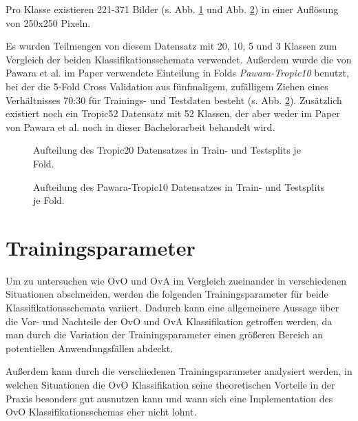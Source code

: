 Pro Klasse existieren 221-371 Bilder (s. Abb. \ref{fig:tropic20Zusammensetzung} und Abb. \ref{fig:pawaraTropic10Zusammensetzung}) in einer Auflösung von 250x250 Pixeln.

Es wurden Teilmengen von diesem Datensatz mit 20, 10, 5 und 3 Klassen zum Vergleich der beiden Klassifikationsschemata verwendet. Außerdem wurde die von Pawara et al. im Paper \cite{pawaraPaper} verwendete Einteilung in Folds \textit{Pawara-Tropic10} \cite{pawaraWebsiteDatensaetze} benutzt, bei der die 5-Fold Cross Validation aus fünfmaligem, zufälligem Ziehen eines Verhältnisses 70:30 für Trainings- und Testdaten besteht (s. Abb. \ref{fig:pawaraTropic10Zusammensetzung}).
Zusätzlich existiert noch ein Tropic52 Datensatz \cite{pawaraWebsiteDatensaetze} mit 52 Klassen, der aber weder im Paper von Pawara et al. \cite{pawaraPaper} noch in dieser Bachelorarbeit behandelt wird.

\begin{figure}[H]
\begin{adjustbox}{width=1.2\textwidth, center}

\end{adjustbox}
\caption{Aufteilung des Tropic20 Datensatzes \cite{pawaraWebsiteDatensaetze} in Train- und Testsplits je Fold.}
\label{fig:tropic20Zusammensetzung}
\end{figure}
\begin{figure}[H]
\begin{adjustbox}{width=1.2\textwidth, center}

\end{adjustbox}
\caption{Aufteilung des Pawara-Tropic10 Datensatzes \cite{pawaraWebsiteDatensaetze} in Train- und Testsplits je Fold.}
\label{fig:pawaraTropic10Zusammensetzung}
\end{figure}


\section{Trainingsparameter}
\label{ch:methodik_parameter}
Um zu untersuchen wie OvO und OvA im Vergleich zueinander in verschiedenen Situationen abschneiden, werden die folgenden Trainingsparameter für beide Klassifikationsschemata variiert.
Dadurch kann eine allgemeinere Aussage über die Vor- und Nachteile der OvO und OvA Klassifikation getroffen werden, da man durch die Variation der Trainingsparameter einen größeren Bereich an potentiellen Anwendungsfällen abdeckt.

Außerdem kann durch die verschiedenen Trainingsparameter analysiert werden, in welchen Situationen die OvO Klassifikation seine theoretischen Vorteile in der Praxis besonders gut ausnutzen kann und wann sich eine Implementation des OvO Klassifikationsschemas eher nicht lohnt.


